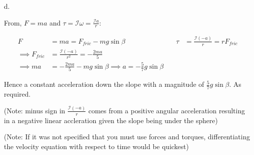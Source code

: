 \documentclass[12pt]{article}
\begin{document}
   d.
    \begin{center}
    \end{center}

    From, $F=ma$ and $\tau=\mathcal{I}\omega=\frac{\mathcal{I}a}{r}$:

    \begin{equation*}
        \begin{alignedat}{2}
            F&=ma=F_{fric}-mg\sin{\beta}\quad&\quad\tau&=\frac{\mathcal{I}(-a)}{r}=rF_{fric}\\
            \implies F_{fric}&=\frac{\mathcal{I}(-a)}{r^2}=-\frac{2ma}{5}\\
            \implies ma&=-\frac{2ma}{5}-mg\sin{\beta}
            \implies a=-\frac{5}{7}g\sin\beta
        \end{alignedat}
    \end{equation*}

    Hence a constant acceleration down the slope with a magnitude of $\frac{5}{7}g\sin\beta$. As required.

    (Note: minus sign in $\frac{\mathcal{I}(-a)}{r}$ comes from a positive angular acceleration resulting in a negative linear accleration given the slope being under the sphere)

    (Note: If it was not specified that you must use forces and torques, differentiating the velocity equation with respect to time would be quickest)
\end{document}
